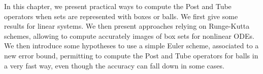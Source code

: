 %
%
%
%
%
%
%
%

%
%
%
%
%








\graphicspath{{part_1/figures}{part_1/figures/}}


In this chapter, we present practical ways to compute the Post and Tube operators 
when sets are represented with boxes or balls.
We first give some results for linear systems. We then present approaches
relying on Runge-Kutta schemes, allowing to compute accurately images of box sets 
for nonlinear ODEs. We then introduce some hypotheses to use a simple Euler scheme,
associated to a new error bound, permitting to compute the Post and Tube operators
for balls in a very fast way, even though the accuracy can fall down in some cases. 

